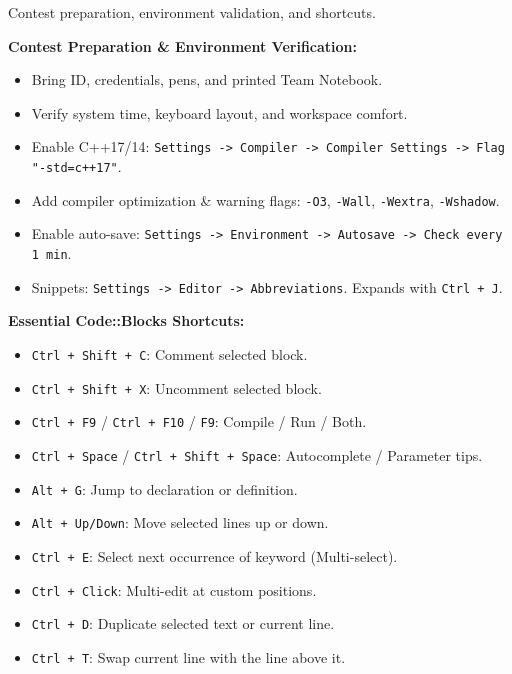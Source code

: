 
Contest preparation, environment validation, and shortcuts.

\textbf{Contest Preparation \& Environment Verification:}
\begin{itemize}
    \item Bring ID, credentials, pens, and printed Team Notebook.
    \item Verify system time, keyboard layout, and workspace comfort.
    \item Enable C++17/14: \lstinline|Settings -> Compiler -> Compiler Settings -> Flag "-std=c++17"|.
    \item Add compiler optimization \& warning flags: \lstinline|-O3|, \lstinline|-Wall|, \lstinline|-Wextra|, \lstinline|-Wshadow|.
    \item Enable auto-save: \lstinline|Settings -> Environment -> Autosave -> Check every 1 min|.
    \item Snippets: \lstinline|Settings -> Editor -> Abbreviations|. Expands with \lstinline|Ctrl + J|.
\end{itemize}

\textbf{Essential Code::Blocks Shortcuts:}
\begin{itemize}
    \item \lstinline|Ctrl + Shift + C|: Comment selected block.
    \item \lstinline|Ctrl + Shift + X|: Uncomment selected block.
    \item \lstinline|Ctrl + F9| / \lstinline|Ctrl + F10| / \lstinline|F9|: Compile / Run / Both.
    \item \lstinline|Ctrl + Space| / \lstinline|Ctrl + Shift + Space|: Autocomplete / Parameter tips.
    \item \lstinline|Alt + G|: Jump to declaration or definition.
    \item \lstinline|Alt + Up/Down|: Move selected lines up or down.
    \item \lstinline|Ctrl + E|: Select next occurrence of keyword (Multi-select).
    \item \lstinline|Ctrl + Click|: Multi-edit at custom positions.
    \item \lstinline|Ctrl + D|: Duplicate selected text or current line.
    \item \lstinline|Ctrl + T|: Swap current line with the line above it.
\end{itemize}
